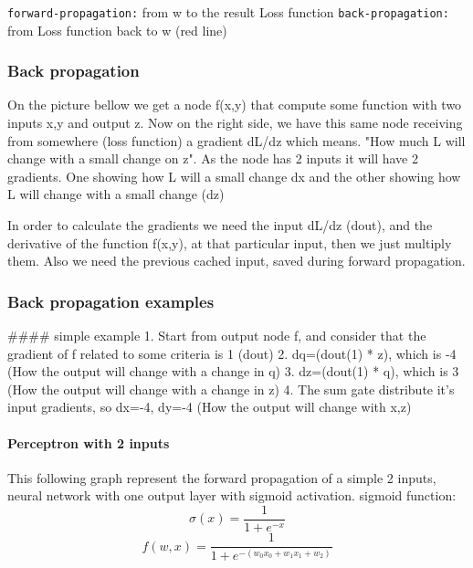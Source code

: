 \documentclass[11pt]{article}
\begin{document}
 \texttt{forward-propagation:} from w to the result Loss function
\texttt{back-propagation:} from Loss function back to w (red line)

    \subsubsection{Back propagation}\label{back-propagation}

On the picture bellow we get a node f(x,y) that compute some function
with two inputs x,y and output z. Now on the right side, we have this
same node receiving from somewhere (loss function) a gradient dL/dz
which means. "How much L will change with a small change on z". As the
node has 2 inputs it will have 2 gradients. One showing how L will a
small change dx and the other showing how L will change with a small
change (dz)

 In order to calculate the gradients we need the input dL/dz (dout), and
the derivative of the function f(x,y), at that particular input, then we
just multiply them. Also we need the previous cached input, saved during
forward propagation. 

    \subsubsection{Back propagation
examples}\label{back-propagation-examples}

 \#\#\#\# simple example 1. Start from output node f, and consider that
the gradient of f related to some criteria is 1 (dout) 2. dq=(dout(1) *
z), which is -4 (How the output will change with a change in q) 3.
dz=(dout(1) * q), which is 3 (How the output will change with a change
in z) 4. The sum gate distribute it's input gradients, so dx=-4, dy=-4
(How the output will change with x,z)

\paragraph{Perceptron with 2 inputs}\label{perceptron-with-2-inputs}

This following graph represent the forward propagation of a simple 2
inputs, neural network with one output layer with sigmoid activation.
sigmoid function: \[\sigma (x) = \frac{1}{1+e^{-x}}\]
\[f(w,x) = \frac{1}{1+e^{-(w_{0}x_{0}+ w_{1}x_{1}+w_{2})}}\]
\end{document}
